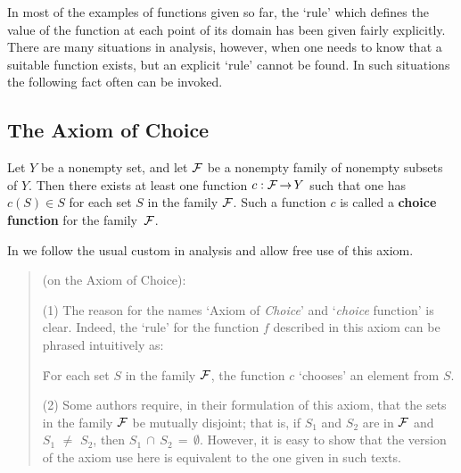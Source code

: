 {\V
\V

        In most of the examples of functions given so far, the `rule' which defines the value of the function at each point of its domain has been given fairly explicitly.
    There are many situations in analysis, however, when one needs to know that a suitable function exists, but an explicit `rule' cannot be found.
    In such situations the following fact often can be invoked.

\V

        \subsection{\small{{\bf The Axiom of  Choice}}}
        \label{AxiomA30.170}

        Let $Y$ be a nonempty set, and let ${\cal F}$ be a nonempty family of nonempty subsets of $Y$.
    Then there exists at least one function $c:{\cal F} \,{\rightarrow}\, Y$ such that one has $c(S){\in}S$ for each set $S$ in the family ${\cal F}$.
    Such a function $c$ is called a {\bf choice function}
    for the family~${\cal F}$.

\V

        In {\TheseNotes} we follow the usual custom in analysis and allow free use of this axiom.

\V
\V

\begin{quotation}
{\footnotesize \underline{\Notes} (on the Axiom of Choice):

\V

        (1) The reason for the names `Axiom of {\em Choice}' and `{\em choice} function' is clear.
    Indeed, the `rule' for the function $f$ described in this axiom can be phrased intuitively as:

        \h For each set $S$ in the family ${\cal F}$, the function $c$ `chooses' an element from $S$.

\V

        (2) Some authors require, in their formulation of this axiom,
    that the sets in the family ${\cal F}$ be mutually disjoint; that is, if $S_{1}$ and $S_{2}$ are in ${\cal F}$ and $S_{1} \,\,{\neq}\,\, S_{2}$,
    then $S_{1}\,{\cap}\,S_{2} \,=\, {\emptyset}$.
    However, it is easy to show that the version of the axiom use here is equivalent to the one given in such texts.

}
\end{quotation}}
